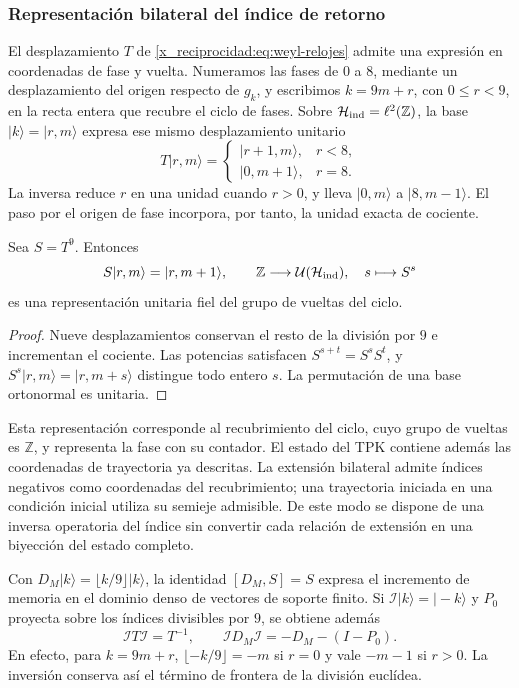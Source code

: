 \subsubsection{Representación bilateral del índice de retorno}

El desplazamiento \(T\) de \eqref{x_reciprocidad:eq:weyl-relojes} admite una
expresión en coordenadas de fase y vuelta. Numeramos las fases de \(0\) a
\(8\), mediante un desplazamiento del origen respecto de \(g_k\), y
escribimos \(k=9m+r\), con \(0\leq r<9\), en la recta entera
que recubre el ciclo de fases. Sobre
\(\mathcal H_{\rm ind}=\ell^2(\mathbb Z)\), la base
\(|k\rangle=|r,m\rangle\) expresa ese mismo desplazamiento unitario
\[
 T|r,m\rangle=
 \begin{cases}
 |r+1,m\rangle,&r<8,\\
 |0,m+1\rangle,&r=8.
 \end{cases}
\]
La inversa reduce \(r\) en una unidad cuando \(r>0\), y lleva
\(|0,m\rangle\) a \(|8,m-1\rangle\). El paso por el origen de fase
incorpora, por tanto, la unidad exacta de cociente.

\begin{proposition}
\label{x_reciprocidad:mono-ampl:representacion}
Sea \(S=T^9\). Entonces
\[
 S|r,m\rangle=|r,m+1\rangle,\qquad
 \mathbb Z\longrightarrow\mathcal U(\mathcal H_{\rm ind}),
 \quad s\longmapsto S^s
\]
es una representación unitaria fiel del grupo de vueltas del ciclo.
\end{proposition}
\begin{proof}
Nueve desplazamientos conservan el resto de la división por \(9\) e
incrementan el cociente. Las potencias satisfacen
\(S^{s+t}=S^sS^t\), y \(S^s|r,m\rangle=|r,m+s\rangle\) distingue
todo entero \(s\). La permutación de una base ortonormal es unitaria.
\end{proof}

Esta representación corresponde al recubrimiento del ciclo, cuyo grupo
de vueltas es \(\mathbb Z\), y representa la fase con su contador. El
estado del TPK contiene además las coordenadas de trayectoria ya descritas.
La extensión bilateral admite índices negativos como coordenadas del
recubrimiento; una trayectoria iniciada en una condición inicial utiliza
su semieje admisible. De este modo se dispone de una inversa operatoria
del índice sin convertir cada relación de extensión en una biyección del
estado completo.

Con \(D_M|k\rangle=\lfloor k/9\rfloor|k\rangle\), la identidad
\([D_M,S]=S\) expresa el incremento de memoria en el dominio denso de
vectores de soporte finito. Si \(\mathcal I|k\rangle=|-k\rangle\) y
\(P_0\) proyecta sobre los índices divisibles por \(9\), se obtiene
además
\begin{equation}
 \mathcal I T\mathcal I=T^{-1},\qquad
 \mathcal I D_M\mathcal I=-D_M-(I-P_0).
 \label{x_reciprocidad:mono-ampl:inversion-contador}
\end{equation}
En efecto, para \(k=9m+r\),
\(\lfloor-k/9\rfloor=-m\) si \(r=0\) y vale \(-m-1\) si \(r>0\).
La inversión conserva así el término de frontera de la división euclídea.

